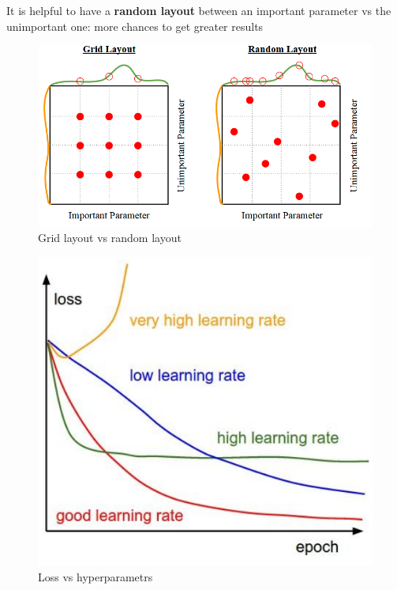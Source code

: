 \documentclass[11pt]{article}
\begin{document}
It is helpful to have a \textbf{random layout} between an important parameter vs the unimportant one: more chances to get greater results
\clearpage
\begin{minipage}{0.5\textwidth}
\begin{figure} [H]
\centering 
\includegraphics[scale=0.55]{L513.pdf}
\caption{ Grid layout vs random layout}
\label{fig:L513}
\end{figure}

\begin{figure} [H]
\centering 
\includegraphics[scale=0.58]{L514.pdf}
\caption{ Loss vs hyperparametrs}
\label{fig:L514}
\end{figure}



\end{minipage}
\end{document}
